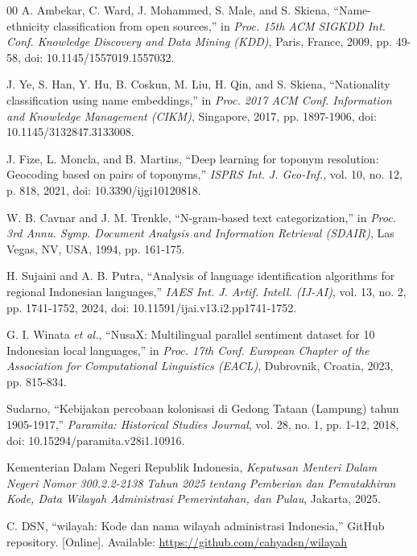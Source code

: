 \documentclass[conference]{IEEEtran}
\begin{document}
\begin{thebibliography}{00}
 A. Ambekar, C. Ward, J. Mohammed, S. Male, and S. Skiena, ``Name-ethnicity classification from open sources,'' in \textit{Proc. 15th ACM SIGKDD Int. Conf. Knowledge Discovery and Data Mining (KDD)}, Paris, France, 2009, pp. 49-58, doi: 10.1145/1557019.1557032.

 J. Ye, S. Han, Y. Hu, B. Coskun, M. Liu, H. Qin, and S. Skiena, ``Nationality classification using name embeddings,'' in \textit{Proc. 2017 ACM Conf. Information and Knowledge Management (CIKM)}, Singapore, 2017, pp. 1897-1906, doi: 10.1145/3132847.3133008.

 J. Fize, L. Moncla, and B. Martins, ``Deep learning for toponym resolution: Geocoding based on pairs of toponyms,'' \textit{ISPRS Int. J. Geo-Inf.}, vol. 10, no. 12, p. 818, 2021, doi: 10.3390/ijgi10120818.

 W. B. Cavnar and J. M. Trenkle, ``N-gram-based text categorization,'' in \textit{Proc. 3rd Annu. Symp. Document Analysis and Information Retrieval (SDAIR)}, Las Vegas, NV, USA, 1994, pp. 161-175.

 H. Sujaini and A. B. Putra, ``Analysis of language identification algorithms for regional Indonesian languages,'' \textit{IAES Int. J. Artif. Intell. (IJ-AI)}, vol. 13, no. 2, pp. 1741-1752, 2024, doi: 10.11591/ijai.v13.i2.pp1741-1752.

 G. I. Winata \textit{et al.}, ``NusaX: Multilingual parallel sentiment dataset for 10 Indonesian local languages,'' in \textit{Proc. 17th Conf. European Chapter of the Association for Computational Linguistics (EACL)}, Dubrovnik, Croatia, 2023, pp. 815-834.

 Sudarno, ``Kebijakan percobaan kolonisasi di Gedong Tataan (Lampung) tahun 1905-1917,'' \textit{Paramita: Historical Studies Journal}, vol. 28, no. 1, pp. 1-12, 2018, doi: 10.15294/paramita.v28i1.10916.

 Kementerian Dalam Negeri Republik Indonesia, \textit{Keputusan Menteri Dalam Negeri Nomor 300.2.2-2138 Tahun 2025 tentang Pemberian dan Pemutakhiran Kode, Data Wilayah Administrasi Pemerintahan, dan Pulau}, Jakarta, 2025.

 C. DSN, ``wilayah: Kode dan nama wilayah administrasi Indonesia,'' GitHub repository. [Online]. Available: \url{https://github.com/cahyadsn/wilayah}


\end{thebibliography}
\end{document}
